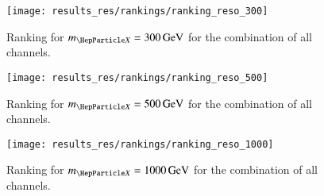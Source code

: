 \begin{figure}[htbp]
  \centering

  \texttt{[image: results\_res/rankings/ranking\_reso\_300]}

  \caption{Ranking for $\mX = \SI{300}{\GeV}$ for the combination of all
    channels.}
\end{figure}

\begin{figure}[htbp]
  \centering

  \texttt{[image: results\_res/rankings/ranking\_reso\_500]}

  \caption{Ranking for $\mX = \SI{500}{\GeV}$ for the combination of all
    channels.}
\end{figure}

\begin{figure}[htbp]
  \centering

  \texttt{[image: results\_res/rankings/ranking\_reso\_1000]}

  \caption{Ranking for $\mX = \SI{1000}{\GeV}$ for the combination of all
    channels.}
\end{figure}


